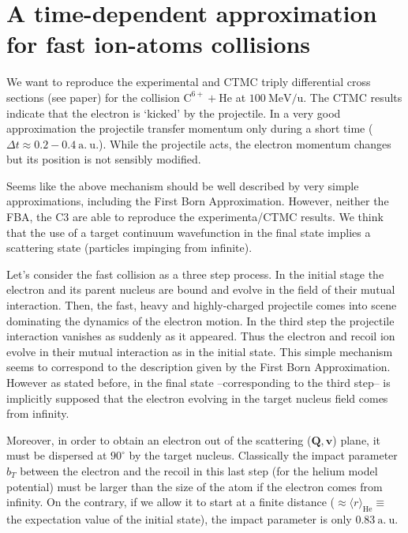 \chapter{A time-dependent approximation for fast ion-atoms collisions}


We want to reproduce the experimental and CTMC triply differential
cross sections (see paper) for the collision $\mathrm{C}^{6+} +
\mathrm{He}$ at $100~\mathrm{MeV/u}$. The CTMC results indicate that
the electron is `kicked' by the projectile. In a very good
approximation the projectile transfer momentum only during a short time
($\Delta t \approx 0.2-0.4\mathrm{~a.~u.}$).  While the projectile acts,
the electron momentum changes but its position is not sensibly
modified.

Seems like the above mechanism should be well described by very simple
approximations, including the First Born Approximation. However,
neither the FBA, the C3 are able to reproduce the experimenta/CTMC
results.
%
We think that the use of a target continuum wavefunction in the final
state implies a scattering state (particles impinging from infinite).

Let's consider the fast collision as a three step process. In the
initial stage the electron and its parent nucleus are bound and evolve
in the field of their mutual interaction. Then, the fast, heavy and
highly-charged projectile comes into scene dominating the dynamics of
the electron motion. In the third step the projectile interaction
vanishes as suddenly as it appeared. Thus the electron and recoil ion
evolve in their mutual interaction as in the initial state.
%
This simple mechanism seems to correspond to the description given by
the First Born Approximation. However as stated before, in the final
state --corresponding to the third step-- is implicitly supposed that
the electron evolving in the target nucleus field comes from infinity.

Moreover, in order to obtain an electron out of the scattering
($\bm{Q},\bm{v}$) plane, it must be dispersed at $90^{\circ}$ by the
target nucleus. Classically the impact parameter $b_{T}$ between the
electron and the recoil in this last step (for the helium model
potential) must be larger than the size of the atom if the electron
comes from infinity. On the contrary, if we allow it to start at a
finite distance ($\approx \langle r \rangle_{\mathrm{He}}\equiv$ the
expectation value of the initial state), the impact parameter is only
0.83$\mathrm{~a.~u.}$

\medskip

